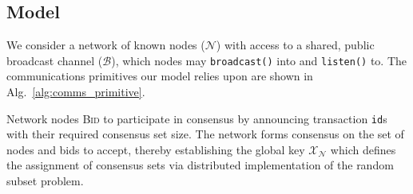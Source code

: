 \subsection{Model}

We consider a network of known nodes ($\mathcal{N}$) with access to a shared, public broadcast channel ($\mathcal{B}$), which nodes may \texttt{broadcast()} into and \texttt{listen()} to. The communications primitives our model relies upon are shown in Alg.~\ref{alg:comms_primitive}.

Network nodes \textsc{Bid} to participate in consensus by announcing transaction \texttt{id}s with their required consensus set size. The network forms consensus on the set of nodes and bids to accept, thereby establishing the global key $\mathcal{X}_\mathcal{N}$ which defines the assignment of consensus sets via distributed implementation of the random subset problem.





%
%

